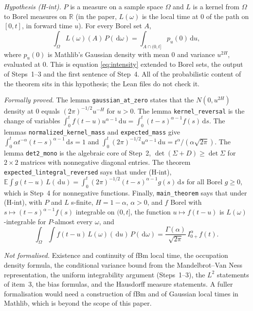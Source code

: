 \documentclass[11pt]{article}
\theoremstyle{remark}
\theoremstyle{definition}
\newcommand{\E}{\mathbb{E}}
\newcommand{\R}{\mathbb{R}}
\newcommand{\dd}{\,\mathrm{d}}
\newcommand{\Ia}{I^{\alpha}_{0+}}
\begin{document}
\emph{Hypothesis (H-int).} $P$ is a measure on a sample space $\Omega$ and $L$ is a kernel from $\Omega$ to Borel measures on $\R$ (in the paper, $L(\omega)$ is the local time at $0$ of the path on $[0,t]$, in forward time $u$). For every Borel set $A$,
\[
\int_\Omega L(\omega)(A)\,P(\dd\omega)=\int_{A\cap(0,t]}p_u(0)\dd u ,
\]
where $p_u(0)$ is Mathlib's Gaussian density with mean $0$ and variance $u^{2H}$, evaluated at $0$. This is equation \eqref{eq:intensity} extended to Borel sets, the output of Steps~1--3 and the first sentence of Step~4. All of the probabilistic content of the theorem sits in this hypothesis; the Lean files do not check it.

\emph{Formally proved.} The lemma \texttt{gaussian\_at\_zero} states that the $N(0,u^{2H})$ density at $0$ equals $(2\pi)^{-1/2}u^{-H}$ for $u>0$. The lemma \texttt{kernel\_reversal} is the change of variables $\int_0^t f(t-u)u^{\alpha-1}\dd u=\int_0^t(t-s)^{\alpha-1}f(s)\dd s$. The lemmas \texttt{normalized\_kernel\_mass} and \texttt{expected\_mass} give $\int_0^t\alpha t^{-\alpha}(t-s)^{\alpha-1}\dd s=1$ and $\int_0^t(2\pi)^{-1/2}u^{\alpha-1}\dd u=t^\alpha/(\alpha\sqrt{2\pi})$. The lemma \texttt{det2\_mono} is the algebraic core of Step~2, $\det(\Sigma+D)\ge\det\Sigma$ for $2\times2$ matrices with nonnegative diagonal entries. The theorem \texttt{expected\_lintegral\_reversed} says that under (H-int), $\E\int g(t-u)\,L(\dd u)=\int_0^t(2\pi)^{-1/2}(t-s)^{\alpha-1}g(s)\dd s$ for all Borel $g\ge0$, which is Step~4 for nonnegative functions. Finally, \texttt{main\_theorem} says that under (H-int), with $P$ and $L$ s-finite, $H=1-\alpha$, $\alpha>0$, and $f$ Borel with $s\mapsto(t-s)^{\alpha-1}f(s)$ integrable on $(0,t]$, the function $u\mapsto f(t-u)$ is $L(\omega)$-integrable for $P$-almost every $\omega$, and
\[
\int_\Omega\int f(t-u)\,L(\omega)(\dd u)\,P(\dd\omega)=\frac{\Gamma(\alpha)}{\sqrt{2\pi}}\,\Ia f(t).
\]

\emph{Not formalised.} Existence and continuity of fBm local time, the occupation density formula, the conditional variance bound from the Mandelbrot--Van Ness representation, the uniform integrability argument (Steps~1--3), the $L^2$ statements of item~3, the bias formulas, and the Hausdorff measure statements. A fuller formalisation would need a construction of fBm and of Gaussian local times in Mathlib, which is beyond the scope of this paper.
\end{document}
